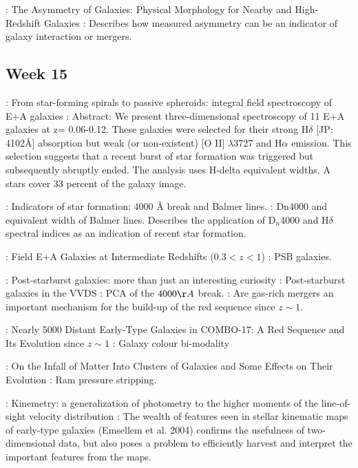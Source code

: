 \documentclass[ceqn,usenatbib,onecolumn]{mnras}
\begin{document}
\par \citet{2000ApJ...529..886C} : {The Asymmetry of Galaxies: Physical Morphology for Nearby and High-Redshift Galaxies} : Describes how measured asymmetry can be an indicator of galaxy interaction or mergers.

\subsection{Week 15}
\par \citet{2012MNRAS.420..672S} : {From star-forming spirals to passive spheroids: integral field spectroscopy of E+A galaxies} : Abstract: We present three-dimensional spectroscopy of 11 E+A galaxies at z= 0.06-0.12. These galaxies were selected for their strong H$\delta$ [JP: 4102\AA] absorption but weak (or non-existent) [O II] $\lambda$3727 and H$\alpha$ emission. This selection suggests that a recent burst of star formation was triggered but subsequently abruptly ended. The analysis uses H-delta equivalent widths. A stars cover 33 percent of the galaxy image. 

\par \citet{1997A&A...325.1025P} : {Indicators of star formation: 4000 {\r{A}} break and Balmer lines.} : Dn4000 and equivalent width of Balmer lines. Describes the application of D$_n$4000 and H$\delta$ spectral indices as an indication of recent star formation. 
\par \citet{2004ApJ...609..683T} : {Field E+A Galaxies at Intermediate Redshifts ($0.3 < z < 1$)} : PSB galaxies.
\par \citet{2009MNRAS.395..144W} : {Post-starburst galaxies: more than just an interesting curiosity} : {Post-starburst galaxies in the VVDS : PCA of the $4000\AA$ break.} : Are gas-rich mergers an important mechanism for the build-up of the red sequence since $z\sim1$.
\par \citet{2004ApJ...608..752B} : {Nearly 5000 Distant Early-Type Galaxies in COMBO-17: A Red Sequence and Its Evolution since $z\sim1$} : Galaxy colour bi-modality
\par \citet{1972ApJ...176....1G} : {On the Infall of Matter Into Clusters of Galaxies and Some Effects on Their Evolution} : Ram pressure stripping.
\par \citet{2006MNRAS.366..787K} : {Kinemetry: a generalization of photometry to the higher moments of the line-of-sight velocity distribution} : The wealth of features seen in stellar kinematic maps of early-type galaxies (Emsellem et al. 2004) confirms the usefulness of two-dimensional data, but also poses a problem to efficiently harvest and interpret the important features from the maps.
\end{document}
